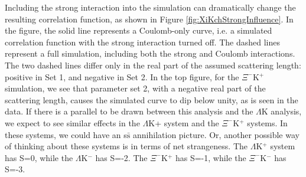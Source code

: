 \documentclass[../AnalysisNoteJBuxton.tex]{subfiles}
\begin{document}
Including the strong interaction into the simulation can dramatically change the resulting correlation function, as shown in Figure \ref{fig:XiKchStrongInfluence}.  In the figure, the solid line represents a Coulomb-only curve, i.e. a simulated correlation function with the strong interaction turned off.  The dashed lines represent a full simulation, including both the strong and Coulomb interactions.  The two dashed lines differ only in the real part of the assumed scattering length: positive in Set 1, and negative in Set 2.  In the top figure, for the $\Xi^{-}$K$^{+}$ simulation, we see that parameter set 2, with a negative real part of the scattering length, causes the simulated curve to dip below unity, as is seen in the data.  If there is a parallel to be drawn between this analysis and the $\Lambda$K analysis, we expect to see similar effects in the $\Lambda$K+ system and the $\Xi^{-}$K$^{+}$ systems.  In these systems, we could have an s$\bar{\mathrm{s}}$ annihilation picture.  Or, another possible way of thinking about these systems is in terms of net strangeness.  The $\Lambda$K$^{+}$ system has S=0, while the $\Lambda$K$^{-}$ has S=-2.  The $\Xi^{-}$K$^{+}$ has S=-1, while the $\Xi^{-}$K$^{-}$ has S=-3.
\end{document}
